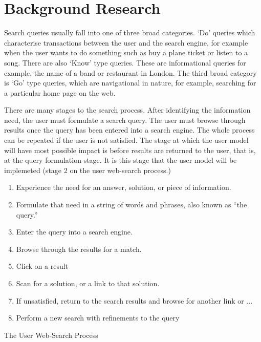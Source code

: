 \documentclass[a4paper, 11pt]{article}
\begin{document}
\section {Background Research}\label{background} 

Search queries usually fall into one of three broad categories.  `Do' queries which characterise transactions between the user and the search engine, for example when the user wants to do something such as buy a plane ticket or listen to a song. There are also `Know' type queries. These are informational queries for example, the name of a band or restaurant in London. The third broad category is `Go' type queries, which are navigational in nature, for example, searching for a particular home page on the web. 

There are many stages to the search process. After identifying the information need, the user must formulate a search query. The user must browse through results once the query has been entered into a search engine. The whole process can be repeated if the user is not satisfied. The stage at which the user model will have most possible impact is before results are returned to the user, that is, at the query formulation stage. It is this stage that the user model will be implemeted (stage 2 on the user web-search process.)


\begin{center}
\begin{enumerate}
\item{Experience the need for an answer,
solution, or piece of information.}
\item{Formulate that need in a string of words and phrases, also known as “the query.”}
\item{Enter the query into a search engine.}
\item{Browse through the results for a match.}
\item{Click on a result}
\item{Scan for a solution, or a link to that solution.}
\item{If unsatisfied, return to the search results and browse for another link or ...}
\item{Perform a new search with refinements to the query}
\label{search flows}
\end {enumerate}

\hspace{1.5cm}
The User Web-Search Process \cite{seo}

\end{center}
\end{document}
